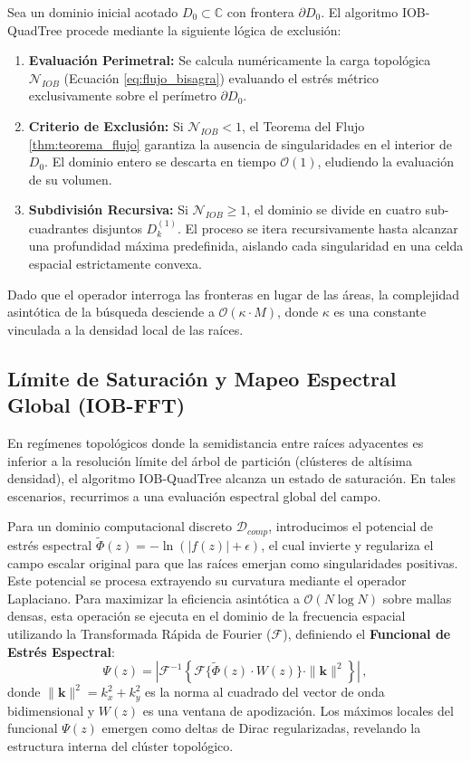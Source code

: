 \documentclass[11pt]{article}
\begin{document}
Sea un dominio inicial acotado $D_0 \subset \mathbb{C}$ con frontera $\partial D_0$. El algoritmo IOB-QuadTree procede mediante la siguiente lógica de exclusión:
\begin{enumerate}
    \item \textbf{Evaluación Perimetral:} Se calcula numéricamente la carga topológica $\mathcal{N}_{IOB}$ (Ecuación \eqref{eq:flujo_bisagra}) evaluando el estrés métrico exclusivamente sobre el perímetro $\partial D_0$.
    \item \textbf{Criterio de Exclusión:} Si $\mathcal{N}_{IOB} < 1$, el Teorema del Flujo \ref{thm:teorema_flujo} garantiza la ausencia de singularidades en el interior de $D_0$. El dominio entero se descarta en tiempo $\mathcal{O}(1)$, eludiendo la evaluación de su volumen.
    \item \textbf{Subdivisión Recursiva:} Si $\mathcal{N}_{IOB} \geq 1$, el dominio se divide en cuatro sub-cuadrantes disjuntos $D_{k}^{(1)}$. El proceso se itera recursivamente hasta alcanzar una profundidad máxima predefinida, aislando cada singularidad en una celda espacial estrictamente convexa.
\end{enumerate}
Dado que el operador interroga las fronteras en lugar de las áreas, la complejidad asintótica de la búsqueda desciende a $\mathcal{O}(\kappa \cdot M)$, donde $\kappa$ es una constante vinculada a la densidad local de las raíces. 

\subsection{Límite de Saturación y Mapeo Espectral Global (IOB-FFT)}

En regímenes topológicos donde la semidistancia entre raíces adyacentes es inferior a la resolución límite del árbol de partición (clústeres de altísima densidad), el algoritmo IOB-QuadTree alcanza un estado de saturación. En tales escenarios, recurrimos a una evaluación espectral global del campo.

Para un dominio computacional discreto $\mathcal{D}_{comp}$, introducimos el potencial de estrés espectral $\tilde{\Phi}(z) = -\ln(|f(z)| + \epsilon)$, el cual invierte y regulariza el campo escalar original para que las raíces emerjan como singularidades positivas. Este potencial se procesa extrayendo su curvatura mediante el operador Laplaciano. Para maximizar la eficiencia asintótica a $\mathcal{O}(N \log N)$ sobre mallas densas, esta operación se ejecuta en el dominio de la frecuencia espacial utilizando la Transformada Rápida de Fourier ($\mathcal{F}$), definiendo el \textbf{Funcional de Estrés Espectral}:
\begin{equation}
    \Psi(z) = \left| \mathcal{F}^{-1} \left\{ \mathcal{F}\{\tilde{\Phi}(z) \cdot W(z)\} \cdot \|\mathbf{k}\|^2 \right\} \right| \,,
\end{equation}
donde $\|\mathbf{k}\|^2 = k_x^2 + k_y^2$ es la norma al cuadrado del vector de onda bidimensional y $W(z)$ es una ventana de apodización. Los máximos locales del funcional $\Psi(z)$ emergen como deltas de Dirac regularizadas, revelando la estructura interna del clúster topológico.
\end{document}
